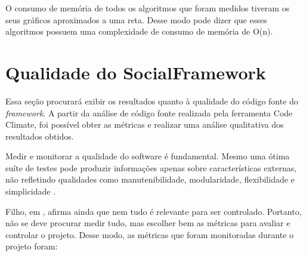 O consumo de memória de todos os algoritmos que foram medidos tiveram os seus gráficos aproximados a uma reta. Desse modo pode dizer que esses algoritmos possuem uma complexidade de consumo de memória de O(n).

\section{Qualidade do SocialFramework}

Essa seção procurará exibir os resultados quanto à qualidade do código fonte do \textit{framework}. A partir da análise de código fonte realizada pela ferramenta Code Climate, foi possível obter as métricas e realizar uma análise qualitativa dos resultados obtidos.

Medir e monitorar a qualidade do software é fundamental. Mesmo uma ótima suíte de testes pode produzir informações apenas sobre características externas, não refletindo qualidades como manutenibilidade, modularidade, flexibilidade e simplicidade \cite{Filho:2013}.

Filho, em \cite{Filho:2013}, afirma ainda que nem tudo é relevante para ser controlado. Portanto, não se deve procurar medir tudo, mas escolher bem as métricas para avaliar e controlar o projeto. Desse modo, as métricas que foram monitoradas durante o projeto foram:


